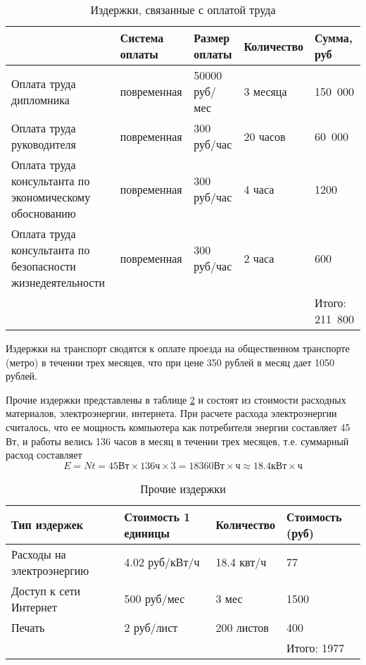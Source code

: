 \begin{table}
\center
\caption{Издержки, связанные с оплатой труда}
\label{costs-salary}
\begin{tabular}{|p{4cm}|p{3cm}|p{2cm}|p{2.5cm}|p{2cm}|}
\hline 
 & Система оплаты & Размер оплаты & Количество & Сумма, руб \\ 
\hline 
Оплата труда дипломника & повременная & 50000 руб/мес & 3 месяца & 150~000 \\ 
\hline 
Оплата труда руководителя & повременная & 300 руб/час & 20 часов & 60~000 \\ 
\hline 
Оплата труда консультанта по экономическому обоснованию & повременная & 300 руб/час & 4 часа & 1200 \\ 
\hline 
Оплата труда консультанта по безопасности жизнедеятельности & повременная & 300 руб/час & 2 часа & 600 \\ 
\hline 
 &  &  &  & Итого: 211~800 \\ 
\hline 
\end{tabular}
\end{table}

Издержки на транспорт сводятся к оплате проезда на общественном транспорте (метро) в течении трех месяцев, что при цене 350 рублей в месяц дает 1050 рублей.

Прочие издержки представлены в таблице \ref{costs-other}
и состоят из стоимости расходных материалов, электроэнергии, интернета.
При расчете расхода электроэнергии считалось, что ее мощность компьютера как 
потребителя энергии составляет 45 Вт, и работы велись 136 часов в месяц в течении
трех месяцев, т.е. суммарный расход составляет
$$ E = N t = 45 Вт \times 136 ч \times 3 = 18360 Вт \times ч \approx 18.4 кВт \times ч $$

\begin{table}
\center
\caption{Прочие издержки}
\label{costs-other}
\begin{tabular}{|p{3cm}|p{3cm}|p{3cm}|p{3cm}|}
\hline 
Тип издержек & Стоимость 1 единицы & Количество & Стоимость (руб) \\ 
\hline 
Расходы на электроэнергию & 4.02 руб/кВт/ч & 18.4 квт/ч & 77 \\ 
\hline 
Доступ к сети Интернет & 500 руб/мес & 3 мес & 1500 \\ 
\hline 
Печать & 2 руб/лист & 200 листов & 400 \\ 
\hline 
 &  &  & Итого: 1977 \\ 
\hline 
\end{tabular} 
\end{table}

